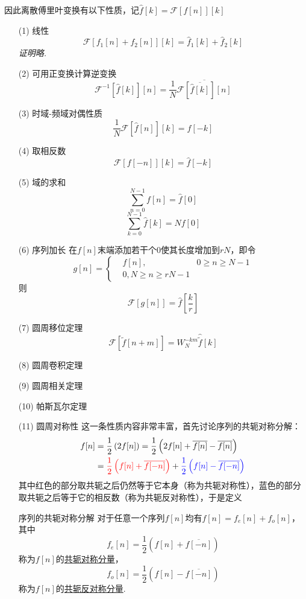 \documentclass[main.tex]{subfiles}
\begin{document}
因此离散傅里叶变换有以下性质，记\(\hat{f}[k]=\mathcal{F}[f[n]][k]\)
\begin{itemize}
    \item [(1)] 线性
    \[\mathcal{F}[f_1[n]+f_2[n]][k]=\hat{f}_1[k]+\hat{f}_2[k]\]
    \textit{
        证明略.
    }
    \item [(2)] 可用正变换计算逆变换
    \[\mathcal{F}^{-1}\left[\hat{f}[k]\right][n] = \frac{1}{N}\overline{\mathcal{F}\left[\overline{\hat{f}[k]}\right][n]}\]
    \item [(3)] 时域-频域对偶性质
    \[\frac{1}{N}\mathcal{F}\left[\hat{f}[n]\right][k]=f[-k]\]
    \item [(4)] 取相反数
    \[\mathcal{F}[f[-n]][k]=\hat{f}[-k]\]
    \item [(5)] 域的求和
    \[\sum_{n=0}^{N-1}f[n]=\hat{f}[0]\]
    \[\sum_{k=0}^{N-1}\hat{f}[k]=Nf[0]\]
    \item [(6)] 序列加长
    在\(f[n]\)末端添加若干个\(0\)使其长度增加到\(rN\)，即令
    \[g[n]=\left\{\begin{aligned}& f[n], & 0 \geq n \geq N-1 \\ & 0, N \geq n \geq rN-1 \end{aligned}\right.\]
    则
    \[\mathcal{F}[g[n]]=\hat{f}\left[\frac{k}{r}\right]\]
    \item [(7)] 圆周移位定理
    \[\mathcal{F}\left[\tilde{f}[n+m]\right]=W_N^{-km}\hat{\tilde{f}}[k]\]
    \item [(8)] 圆周卷积定理
    \item [(9)] 圆周相关定理
    \item [(10)] 帕斯瓦尔定理
    \item [(11)] 圆周对称性
    \newline
    这一条性质内容非常丰富，首先讨论序列的共轭对称分解：
    \begin{align*}
        f[n] & =\frac{1}{2}\left(2f[n]\right)=\frac{1}{2}\left(2f[n]+\overline{f[n]}-\overline{f[n]}\right) \\
        &= {\color{red}\frac{1}{2}\left(f[n]+\overline{f[-n]}\right)}+{\color{blue}\frac{1}{2}\left(f[n]-\overline{f[-n]}\right)}
    \end{align*}
    其中红色的部分取共轭之后仍然等于它本身（称为共轭对称性），蓝色的部分取共轭之后等于它的相反数（称为共轭反对称性），于是定义
    \begin{definition}{序列的共轭对称分解}
        对于任意一个序列\(f[n]\)均有\(f[n]=f_e[n]+f_o[n]\)，其中
        \[f_e[n]=\frac{1}{2}\left(f[n]+\overline{f[-n]}\right)\]
        称为\(f[n]\)的\uline{共轭对称分量}，
        \[f_o[n]=\frac{1}{2}\left(f[n]-\overline{f[-n]}\right)\]
        称为\(f[n]\)的\uline{共轭反对称分量}.
    \end{definition}
\end{itemize}
\end{document}
